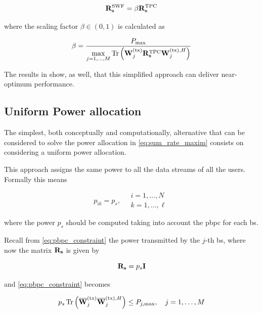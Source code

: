 \begin{equation} \label{eq:power_allocation_scaled}
    \mathbf{R}_{\mathbf{s}}^{\text{SWF}} = \beta \mathbf{R}_{\mathbf{s}}^{\text{TPC}}
\end{equation}

\noindent
where the scaling factor $\beta \in \left(0, 1\right)$ is calculated as

\begin{equation} \label{eq:scaling_factor}
    \beta = \frac{P_{\max}}{\max\limits_{j=1, \ldots, M} \operatorname*{Tr}\left(
    \mathbf{W}^{(\text{tx})}_j \mathbf{R}_{\mathbf{s}}^{\text{TPC}} \mathbf{W}^{(\text{tx}),H}_j \right)}
\end{equation}

The results in \cite{zhang09} show, as well, that this simplified approach can
deliver near-optimum performance.

\subsection{Uniform Power allocation}\label{ssec:uniform_allocation}

The simplest, both conceptually and computationally, alternative that can be
considered to solve the power allocation in \eqref{eq:sum_rate_maxim} consists
on considering a uniform power allocation.

This approach assigns the same power to all the data streams of all the
users. Formally this means

\begin{equation} \label{eq:equal_power}
    p_{ik} = p_{s}, \quad \begin{array}{l}
        i = 1, \ldots, N \\
        k = 1, \ldots, \ell
    \end{array}
\end{equation}

\noindent
where the power $p_s$ should be computed taking into account the \gls{pbpc} for
each \gls{bs}.

Recall from \eqref{eq:pbpc_constraint} the power transmitted by the $j$-th
\gls{bs}, where now the matrix $\mathbf{R}_{\mathbf{s}}$ is given by

\begin{equation} \label{eq:rs_equal}
    \mathbf{R}_{\mathbf{s}} = p_s \mathbf{I}
\end{equation}

\noindent
and \eqref{eq:pbpc_constraint} becomes

\begin{equation} \label{eq:pbpc_equal}
    p_s \operatorname*{Tr} \left( \mathbf{\overline{W}}^{(\text{tx})}_j \mathbf{\overline{W}}^{(\text{tx}),H}_j \right) \leq P_{j, \max}, \quad
    j = 1, \ldots, M
\end{equation}

